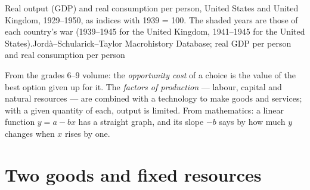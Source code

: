 \begin{openingchart}{Real output (GDP) and real consumption per person, United States and United
Kingdom, 1929--1950, as indices with 1939 = 100. The shaded years are those of each country's war
(1939--1945 for the United Kingdom, 1941--1945 for the United States).}{Jord\`a--Schularick--Taylor
Macrohistory Database; real GDP per person and real consumption per person}
\end{openingchart}

\begin{recall}
From the grades 6--9 volume: the \emph{opportunity cost} of a choice is the value of the best option
given up for it. The \emph{factors of production} --- labour, capital and natural resources --- are
combined with a technology to make goods and services; with a given quantity of each, output is
limited. From mathematics: a linear function $y = a - bx$ has a straight graph, and its slope $-b$
says by how much $y$ changes when $x$ rises by one.
\end{recall}

\section{Two goods and fixed resources}\label{sec:g10:production-possibility-frontier:two-goods}

